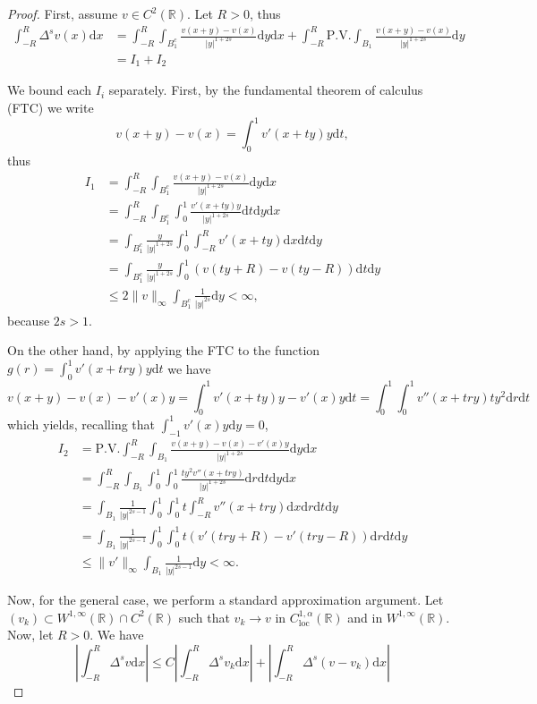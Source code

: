 \documentclass[11pt,a4paper]{amsart}
\newcommand{\R}{\mathbb{R}}
\newcommand{\PV}{\mathrm{P.V.}}
\newcommand{\dx}{\mathrm{d}x}
\newcommand{\dy}{\mathrm{d}y}
\newcommand{\dt}{\mathrm{d}t}
\newcommand{\dr}{\mathrm{d}r}
\begin{document}
\begin{proof}
First, assume $v\in C^2(\R)$. Let $R>0$, thus
\begin{align*}
\int_{-R}^R \Delta^s v(x) \dx &= \int_{-R}^R \int_{B_1^c} \frac{v(x + y) - v(x)}{|y|^{1+2s}} \dy \dx + \int_{-R}^R \PV \int_{B_1} \frac{v(x+y) - v(x)}{|y|^{1+2s}} \dy \\
&= I_1 + I_2
\end{align*}

We bound each $I_i$ separately. First, by the fundamental theorem of calculus (FTC) we write
\[v(x+y) - v(x) =\int_0^1v'(x+ty)y\dt,\]
thus
\begin{align*}
I_1 &= \int_{-R}^R \int_{B_1^c} \frac{v(x + y) - v(x)}{|y|^{1+2s}} \dy \dx \\
&= \int_{-R}^R \int_{B_1^c} \int_0^1 \frac{ v'(x + ty)y}{|y|^{1+2s}} \dt\dy\dx \\
&= \int_{B_1^c} \frac{y}{|y|^{1+2s}}\int_0^1 \int_{-R}^R v'(x + ty) \dx \dt \dy \\
&= \int_{B_1^c} \frac{y}{|y|^{1+2s}}\int_0^1 (v(ty + R) - v(ty - R))\dt \dy \\
&\leq 2\|v\|_{\infty} \int_{B_1^c} \frac{1}{|y|^{2s}}\dy < \infty,
\end{align*}
because $2s> 1$. 

On the other hand, by applying the FTC to the function $ g(r) = \int_0^1 v'(x+try)y\dt$ we have
\[v(x+y) - v(x) -v'(x)y = \int_0^1 v'(x+ty) y - v'(x)y \dt = \int_0^1 \int_0^1 v''(x +try) ty^2 \dr \dt\]
which yields, recalling that $\int_{-1}^1 v'(x) y \dy = 0$, 
\begin{align*}
I_2 &= \PV\int_{-R}^R \int_{B_1} \frac{v(x+y) - v(x) - v'(x)y}{|y|^{1+2s}} \dy \dx\\
&= \int_{-R}^R \int_{B_1} \int_0^1 \int_0^1 \frac{ty^2 v''(x+try)}{|y|^{1+2s}} \dr\dt \dy \dx \\
&= \int_{B_1} \frac{1}{|y|^{2s-1}}\int_0^1 \int_0^1 t \int_{-R}^R v''(x+try) \dx  \dr\dt \dy \\
&= \int_{B_1} \frac{1}{|y|^{2s-1}}\int_0^1 \int_0^1 t (v'(try + R) - v' (try -R)) \dr\dt \dy \\
&\leq   \|v'\|_{\infty}  \int_{B_1} \frac{1}{|y|^{2s-1}} \dy < \infty.
\end{align*}

Now, for the general case, we perform a standard approximation argument. Let $(v_k) \subset W^{1,\infty}(\R) \cap C^2(\R)$ such that $v_k\rightarrow v$ in $C_{\text{loc}}^{1,\alpha}(\R)$ and in $W^{1,\infty}(\R)$. Now, let $R>0$. We have
\[\left| \int_{-R}^R \Delta^s v\dx \right| \leq C\left| \int_{-R}^R \Delta^s v_k\dx \right| + \left| \int_{-R}^R \Delta^s(v-v_k) \dx\right| \]


\end{proof}
\end{document}

